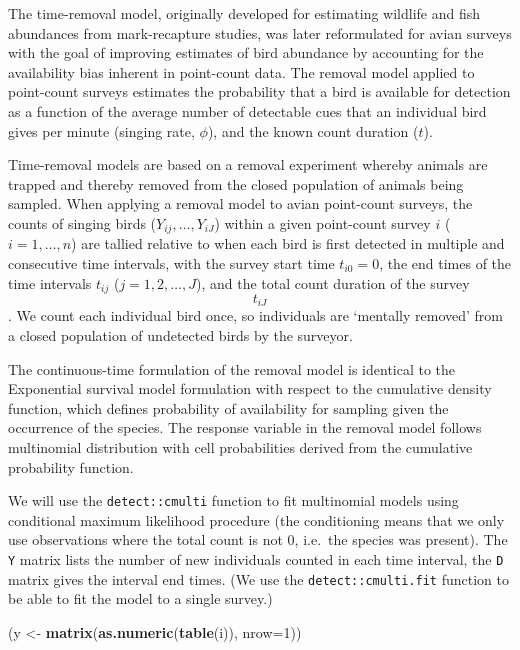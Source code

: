 \documentclass[12pt,]{book}
\newenvironment{Shaded}{\begin{snugshade}}{\end{snugshade}}
\newcommand{\DataTypeTok}[1]{\textcolor[rgb]{0.13,0.29,0.53}{#1}}
\newcommand{\DecValTok}[1]{\textcolor[rgb]{0.00,0.00,0.81}{#1}}
\newcommand{\KeywordTok}[1]{\textcolor[rgb]{0.13,0.29,0.53}{\textbf{#1}}}
\newcommand{\NormalTok}[1]{#1}
\newcommand{\StringTok}[1]{\textcolor[rgb]{0.31,0.60,0.02}{#1}}
\begin{document}
The time-removal model, originally developed for estimating wildlife and fish abundances from mark-recapture studies, was later reformulated for avian surveys with the goal of improving estimates of bird abundance by accounting for the availability bias inherent in point-count data. The removal model applied to point-count surveys estimates the probability that a bird is available for detection as a function of the average number of detectable cues that an individual bird gives per minute (singing rate, \(\phi\)), and the known count duration (\(t\)).

Time-removal models are based on a removal experiment whereby animals are trapped and thereby removed from the closed population of animals being sampled. When applying a removal model to avian point-count surveys, the counts of singing birds (\(Y_{ij}, \ldots, Y_{iJ}\)) within a given point-count survey \(i\) (\(i = 1,\ldots, n\)) are tallied relative to when each bird is first detected in multiple and consecutive time intervals, with the survey start time \(t_{i0} = 0\), the end times of the time intervals \(t_{ij}\) (\(j = 1, 2,\ldots, J\)), and the total count duration of the survey \[t_{iJ}\]. We count each individual bird once, so individuals are `mentally removed' from a closed population of undetected birds by the surveyor.

The continuous-time formulation of the removal model is identical to the Exponential survival model
formulation with respect to the cumulative density function, which defines probability of
availability for sampling given the occurrence of the species.
The response variable in the removal model follows multinomial distribution
with cell probabilities derived from the cumulative probability function.

We will use the \texttt{detect::cmulti} function to fit multinomial models using
conditional maximum likelihood procedure (the conditioning means that we only use
observations where the total count is not 0, i.e.~the species was present).
The \texttt{Y} matrix lists the number of new individuals counted in each time interval,
the \texttt{D} matrix gives the interval end times.
(We use the \texttt{detect::cmulti.fit} function to be able to fit the model to a single survey.)

\begin{Shaded}
\begin{Highlighting}[]
\NormalTok{(y <-}\StringTok{ }\KeywordTok{matrix}\NormalTok{(}\KeywordTok{as.numeric}\NormalTok{(}\KeywordTok{table}\NormalTok{(i)), }\DataTypeTok{nrow=}\DecValTok{1}\NormalTok{))}
\end{Highlighting}
\end{Shaded}
\end{document}
